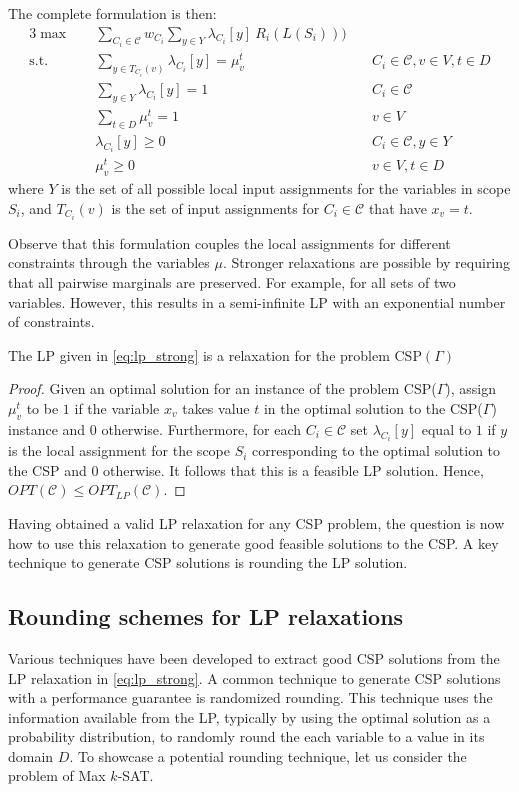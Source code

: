 The complete formulation is then:
\begin{alignat}{3}
\max \quad & \sum_{C_i \in \mathcal{C}} w_{C_i} \sum_{ y \in Y }  \lambda_{C_i}[y] \  R_i(L(S_i))) \label{eq:lp_strong}\\
\text{s.t.} \quad & 	\sum_{y \in T_{C_i}(v)} \lambda_{C_i}[y] = \mu_v^t & \quad C_i \in \mathcal{C}, v \in V, t \in D \nonumber \\
& \sum_{y \in Y} \lambda_{C_i}[ y ] = 1 & \quad  C_i \in \mathcal{C} \nonumber\\
& \sum_{t \in D} \mu_v^t = 1 & \quad v \in V \nonumber\\
& \lambda_{C_i}[ y ] \ge 0 & \quad C_i \in \mathcal{C}, y \in Y \nonumber\\
&	\mu_v^t \ge 0	& \quad v \in  V, t \in D \nonumber
\end{alignat}
where $Y$ is the set of all possible local input assignments for the variables in scope $S_i$, and $T_{C_i}(v)$ is the set of input assignments for $C_i \in \mathcal{C}$ that have $x_v = t$.

Observe that this formulation couples the local assignments for different constraints through the variables $\mu$. 
Stronger relaxations are possible by requiring that all pairwise marginals are preserved. For example, for all sets of two variables. 
However, this results in a semi-infinite LP with an exponential number of constraints. 

\begin{thm}
	The LP given in \eqref{eq:lp_strong} is a relaxation for the problem CSP$(\Gamma)$
\end{thm}
\begin{proof}
	Given an optimal solution for an instance of the problem CSP($\Gamma$), assign $\mu_v^t$ to be $1$ if the variable $x_v$ takes value $t$ in the optimal solution to the CSP($\Gamma$) instance and $0$ otherwise.
	Furthermore, for each $C_i \in \mathcal{C}$ set $\lambda_{C_i}[y]$ equal to $1$ if $y$ is the local assignment for the scope $S_i$ corresponding to the optimal solution to the CSP and $0$ otherwise. 
	It follows that this is a feasible LP solution. 
	Hence, $OPT(\mathcal{C}) \le OPT_{LP}(\mathcal{C})$.
\end{proof}

Having obtained a valid LP relaxation for any CSP problem, the question is now how to use this relaxation to generate good feasible solutions to the CSP. 
A key technique to generate CSP solutions is rounding the LP solution.

\subsection{Rounding schemes for LP relaxations}
Various techniques have been developed to extract good CSP solutions from the LP relaxation in \eqref{eq:lp_strong}.
A common technique to generate CSP solutions with a performance guarantee is randomized rounding.
This technique uses the information available from the LP, typically by using the optimal solution as a probability distribution, to randomly round the each variable to a value in its domain $D$.
To showcase a potential rounding technique, let us consider the problem of Max $k$-SAT.

